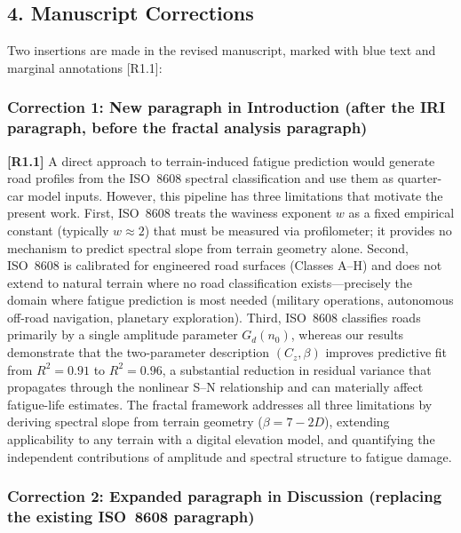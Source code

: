 \documentclass[11pt]{article}
\begin{document}
\subsection*{4. Manuscript Corrections}

Two insertions are made in the revised manuscript, marked with {\color{revisionblue}blue text} and marginal annotations [R1.1]:

\subsubsection*{Correction 1: New paragraph in Introduction (after the IRI paragraph, before the fractal analysis paragraph)}

{\color{revisionblue}
\textbf{[R1.1]} A direct approach to terrain-induced fatigue prediction would generate road profiles from the ISO~8608 spectral classification \cite{ISO8608} and use them as quarter-car model inputs. However, this pipeline has three limitations that motivate the present work. First, ISO~8608 treats the waviness exponent $w$ as a fixed empirical constant (typically $w \approx 2$) that must be measured via profilometer; it provides no mechanism to predict spectral slope from terrain geometry alone. Second, ISO~8608 is calibrated for engineered road surfaces (Classes A--H) and does not extend to natural terrain where no road classification exists---precisely the domain where fatigue prediction is most needed (military operations, autonomous off-road navigation, planetary exploration). Third, ISO~8608 classifies roads primarily by a single amplitude parameter $G_d(n_0)$, whereas our results demonstrate that the two-parameter description $(C_z, \beta)$ improves predictive fit from $R^2 = 0.91$ to $R^2 = 0.96$, a substantial reduction in residual variance that propagates through the nonlinear S--N relationship and can materially affect fatigue-life estimates. The fractal framework addresses all three limitations by deriving spectral slope from terrain geometry ($\beta = 7-2D$), extending applicability to any terrain with a digital elevation model, and quantifying the independent contributions of amplitude and spectral structure to fatigue damage.
}

\subsubsection*{Correction 2: Expanded paragraph in Discussion (replacing the existing ISO~8608 paragraph)}
\end{document}
